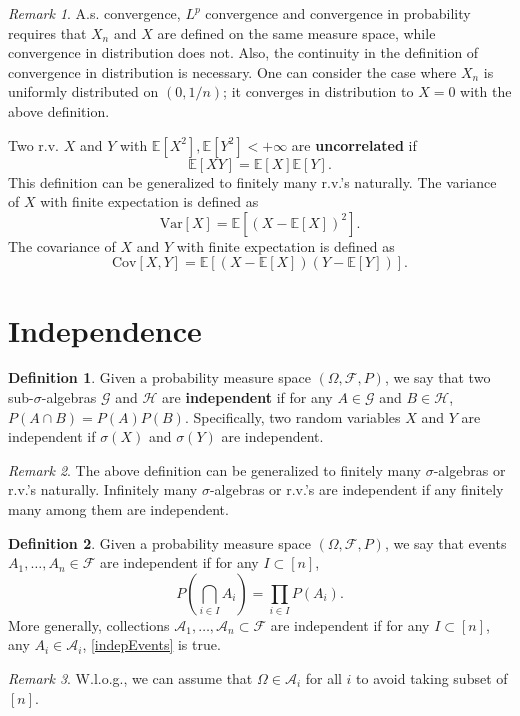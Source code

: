 \documentclass[openany]{book}
\theoremstyle{definition}
\newtheorem{definition}{Definition}[chapter]
\theoremstyle{remark}
\newtheorem*{remark}{Remark}
\begin{document}
\begin{remark}
    A.s. convergence, $L^p$ convergence and convergence in probability requires that $X_n$ and $X$ are defined on the same measure space, while convergence in distribution does not. Also, the continuity in the definition of convergence in distribution is necessary. One can consider the case where $X_n$ is uniformly distributed on $(0,1/n)$; it converges in distribution to $X=0$ with the above definition.
\end{remark}

Two r.v. $X$ and $Y$ with $\mathbb{E}[X^2],\mathbb{E}[Y^2]<+\infty$ are \textbf{uncorrelated} if
\begin{equation*}
    \mathbb{E}[XY]=\mathbb{E}[X]\mathbb{E}[Y].
\end{equation*}
This definition can be generalized to finitely many r.v.'s naturally. The variance of $X$ with finite expectation is defined as
\begin{equation*}
    \mathrm{Var}[X]=\mathbb{E}[(X-\mathbb{E}[X])^2].
\end{equation*}
The covariance of $X$ and $Y$ with finite expectation is defined as
\begin{equation*}
    \mathrm{Cov}[X,Y]=\mathbb{E}[(X-\mathbb{E}[X])(Y-\mathbb{E}[Y])].
\end{equation*}

\section{Independence}
\begin{definition}
    Given a probability measure space $(\Omega,\mathcal{F},P)$, we say that two sub-$\sigma$-algebras $\mathcal{G}$ and $\mathcal{H}$ are \textbf{independent} if for any $A\in \mathcal{G}$ and $B\in \mathcal{H}$, $P(A\cap B)=P(A)P(B)$. Specifically, two random variables $X$ and $Y$ are independent if $\sigma(X)$ and $\sigma(Y)$ are independent.
\end{definition}
\begin{remark}
    The above definition can be generalized to finitely many $\sigma$-algebras or r.v.'s naturally. Infinitely many $\sigma$-algebras or r.v.'s are independent if any finitely many among them are independent.
\end{remark}
\begin{definition}
    Given a probability measure space $(\Omega,\mathcal{F},P)$, we say that events $A_1,\ldots,A_n\in \mathcal{F}$ are independent if for any $I\subset[n]$,
    \begin{equation}\label{indepEvents}
        P\left(\bigcap_{i\in I}A_i\right)=\prod_{i\in I}P(A_i).
    \end{equation}
    More generally, collections $\mathcal{A}_1,\ldots,\mathcal{A}_n\subset \mathcal{F}$ are independent if for any $I\subset[n]$, any $A_i\in \mathcal{A}_i$, \eqref{indepEvents} is true.
\end{definition}
\begin{remark}
    W.l.o.g., we can assume that $\Omega\in \mathcal{A}_i$ for all $i$ to avoid taking subset of $[n]$.
\end{remark}
\end{document}
